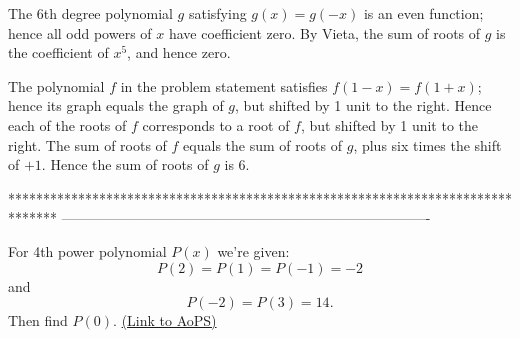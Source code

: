 \begin{solution}
	The 6th degree polynomial $g$ satisfying $g(x)=g(-x)$ is an even function; 
hence all odd powers of $x$ have coefficient zero.
By Vieta, the sum of roots of $g$ is the coefficient of $x^5$, and hence zero.

The polynomial $f$ in the problem statement satisfies $f(1-x)=f(1+x)$;
hence its graph equals the graph of $g$, but shifted by 1 unit to the right.
Hence each of the roots of $f$ corresponds to a root of $f$, but shifted by 1 unit to the right.
The sum of roots of $f$ equals the sum of roots of $g$, plus six times the shift of $+1$.
Hence the sum of roots of $g$ is $6$.
\end{solution}
*******************************************************************************
-------------------------------------------------------------------------------

\begin{problem}
	For 4th power polynomial $P(x)$ we're given: $$P(2) = P(1) = P(-1) = -2$$ and $$P(-2) = P(3) = 14.$$ Then find $P(0).$
	\flushright \href{https://artofproblemsolving.com/community/c6h1597300}{(Link to AoPS)}
\end{problem}










